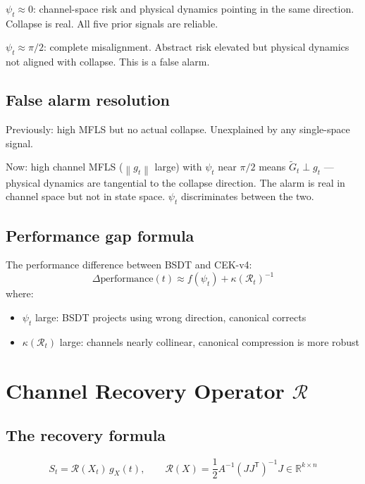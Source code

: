 \documentclass[11pt,a4paper]{article}
\theoremstyle{definition}
\newcommand{\R}{\mathbb{R}}
\newcommand{\T}{^{\mathsf{T}}}
\newcommand{\norm}[1]{\left\|#1\right\|}
\newcommand{\gX}{g_X}
\begin{document}
$\psi_t \approx 0$: channel-space risk and physical dynamics pointing in the same direction.
Collapse is real. All five prior signals are reliable.

$\psi_t \approx \pi/2$: complete misalignment.
Abstract risk elevated but physical dynamics not aligned with collapse.
This is a false alarm.

\subsection{False alarm resolution}

Previously: high MFLS but no actual collapse. Unexplained by any single-space signal.

Now: high channel MFLS ($\norm{g_t}$ large) with $\psi_t$ near $\pi/2$
means $\tilde G_t \perp g_t$ — physical dynamics are tangential to the collapse direction.
The alarm is real in channel space but not in state space.
$\psi_t$ discriminates between the two.

\subsection{Performance gap formula}

The performance difference between BSDT and CEK-v4:
\[
\Delta\text{performance}(t) \approx f(\psi_t) + \kappa(\mathcal{R}_t)^{-1}
\]
where:
\begin{itemize}
\item $\psi_t$ large: BSDT projects using wrong direction, canonical corrects
\item $\kappa(\mathcal{R}_t)$ large: channels nearly collinear, canonical compression is more robust
\end{itemize}

\section{Channel Recovery Operator $\mathcal{R}$}

\subsection{The recovery formula}

\begin{lockedbox}
\[
S_t = \mathcal{R}(X_t)\,\gX(t), \qquad \mathcal{R}(X) = \frac{1}{2}A^{-1}(JJ\T)^{-1}J \in \R^{k\times n}
\]
\end{lockedbox}
\end{document}
